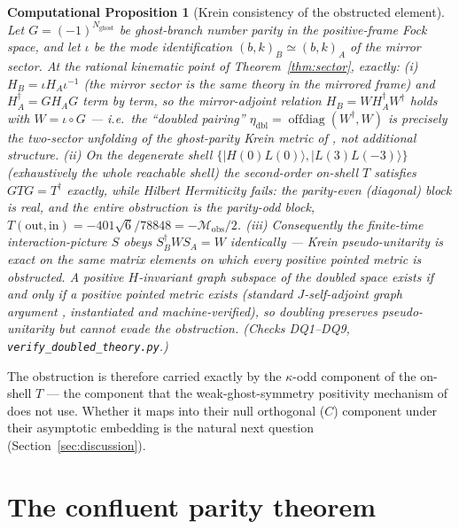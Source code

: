 \documentclass[11pt]{article}
\newtheorem{cproposition}[theorem]{Computational Proposition}
\theoremstyle{definition}
\theoremstyle{remark}
\newcommand{\dg}{\dagger}
\begin{document}
\begin{cproposition}[Krein consistency of the obstructed element]
\label{cprop:krein}
Let $G=(-1)^{N_{\mathrm{ghost}}}$ be ghost-branch number parity in the
positive-frame Fock space, and let $\iota$ be the mode identification
$(b,k)_B\simeq(b,k)_A$ of the mirror sector.  At the rational
kinematic point of Theorem~\ref{thm:sector}, exactly:
(i) $H_B=\iota H_A\iota^{-1}$ (the mirror sector is the same theory in
the mirrored frame) and $H_A^{\dg}=GH_AG$ term by term, so the
mirror-adjoint relation $H_B=WH_A^{\dg}W^{\dg}$ holds with
$W=\iota\circ G$ --- i.e.\ the ``doubled pairing''
$\eta_{\mathrm{dbl}}=\operatorname{offdiag}(W^{\dg},W)$ is precisely
the two-sector unfolding of the ghost-parity Krein metric of
\cite{BT2026}, not additional structure.
(ii) On the degenerate shell $\{|H(0)L(0)\rangle,|L(3)L(-3)\rangle\}$
(exhaustively the whole reachable shell) the second-order on-shell $T$
satisfies $GTG=T^{\dg}$ exactly, while Hilbert Hermiticity fails: the
parity-even (diagonal) block is real, and the entire obstruction is
the parity-odd block,
$T(\mathrm{out},\mathrm{in})=-401\sqrt6/78848=-\mathcal
M_{\mathrm{obs}}/2$.
(iii) Consequently the finite-time interaction-picture $S$ obeys
$S_B^{\dg}WS_A=W$ identically --- Krein pseudo-unitarity is exact on
the same matrix elements on which every positive pointed metric is
obstructed.  A positive $H$-invariant graph subspace of the doubled
space exists if and only if a positive pointed metric exists
(standard $J$-self-adjoint graph argument \cite{AzizovIokhvidov},
instantiated and machine-verified), so doubling preserves
pseudo-unitarity but cannot evade the obstruction.
(Checks DQ1--DQ9, \texttt{verify\_doubled\_theory.py}.)
\end{cproposition}

The obstruction is therefore carried exactly by the $\kappa$-odd
component of the on-shell $T$ --- the component that the
weak-ghost-symmetry positivity mechanism of \cite{BT2026} does not
use.  Whether it maps into their null orthogonal ($C$) component under
their asymptotic embedding is the natural next question
(Section~\ref{sec:discussion}).

\section{The confluent parity theorem}\label{sec:confluent}
\end{document}
